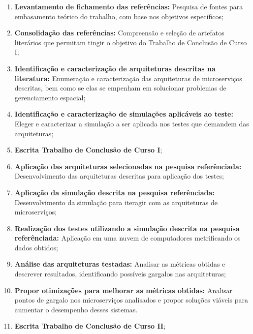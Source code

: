 \begin{enumerate}
  \item \textbf{Levantamento de fichamento das referências:} Pesquisa de fontes para embasamento teórico do trabalho, com base nos objetivos específicos;

  \item \textbf{Consolidação das referências:} Compreensão e seleção de artefatos literários que permitam tingir o objetivo do Trabalho de Conclusão de Curso I;

  \item \textbf{Identificação e caracterização de arquiteturas descritas na literatura:} Enumeração e caracterização das arquiteturas de microserviços descritas, bem como se elas se empenham em solucionar problemas de gerenciamento espacial;

  \item \textbf{Identificação e caracterização de simulações aplicáveis ao teste:} Eleger e caracterizar a simulação a ser aplicada nos testes que demandem das arquiteturas;

  \item \textbf{Escrita Trabalho de Conclusão de Curso I};

  \item \textbf{Aplicação das arquiteturas selecionadas na pesquisa referênciada:} Desenvolvimento das arquiteturas descritas para aplicação dos testes;

  \item \textbf{Aplicação da simulação descrita na pesquisa referênciada:} Desenvolvimento da simulação para iteragir com as arquiteturas de microserviços;

  \item \textbf{Realização dos testes utilizando a simulação descrita na pesquisa referênciada:} Aplicação em uma nuvem de computadores metrificando os dados obtidos;

  \item \textbf{Análise das arquiteturas testadas:} Analisar as métricas obtidas e descrever resultados, identificando possíveis gargalos nas arquiteturas;

  \item \textbf{Propor otimizações para melhorar as métricas obtidas:} Analisar pontos de gargalo nos microserviços analisados e propor soluções viáveis para aumentar o desempenho desses sistemas.

  \item \textbf{Escrita Trabalho de Conclusão de Curso II};
\end{enumerate}
